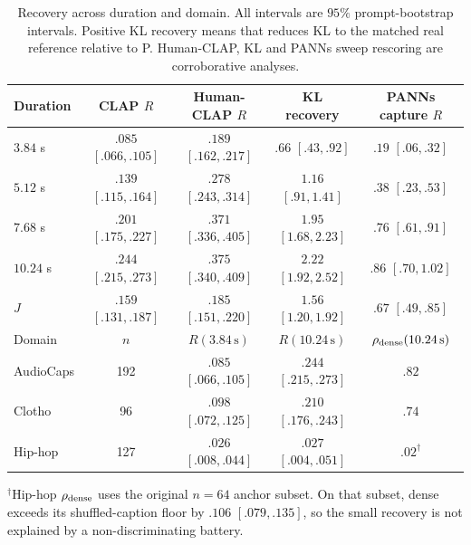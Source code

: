 \begin{table}[t]
\centering
\caption{Recovery across duration and domain. All intervals are $95\%$ prompt-bootstrap intervals. Positive KL recovery means that \PFT{} reduces KL to the matched real reference relative to P. Human-CLAP, KL and PANNs sweep rescoring are corroborative analyses.}
\label{tab:evidence}
\setlength{\tabcolsep}{4.2pt}
\begin{tabular}{@{}lcccc@{}}
\toprule
Duration & CLAP $R$ & Human-CLAP $R$ & KL recovery & PANNs capture $R$ \\
\midrule
$3.84$ s & $.085$ $[.066,.105]$ & $.189$ $[.162,.217]$ & $.66$ $[.43,.92]$ & $.19$ $[.06,.32]$ \\
$5.12$ s & $.139$ $[.115,.164]$ & $.278$ $[.243,.314]$ & $1.16$ $[.91,1.41]$ & $.38$ $[.23,.53]$ \\
$7.68$ s & $.201$ $[.175,.227]$ & $.371$ $[.336,.405]$ & $1.95$ $[1.68,2.23]$ & $.76$ $[.61,.91]$ \\
$10.24$ s & $.244$ $[.215,.273]$ & $.375$ $[.340,.409]$ & $2.22$ $[1.92,2.52]$ & $.86$ $[.70,1.02]$ \\
$J$ & $.159$ $[.131,.187]$ & $.185$ $[.151,.220]$ & $1.56$ $[1.20,1.92]$ & $.67$ $[.49,.85]$ \\
\midrule
Domain & $n$ & $R(3.84\,\mathrm{s})$ & $R(10.24\,\mathrm{s})$ & $\rho_{\rm dense}(10.24\,\mathrm{s})$ \\
\midrule
AudioCaps & 192 & $.085$ $[.066,.105]$ & $.244$ $[.215,.273]$ & $.82$ \\
Clotho & 96 & $.098$ $[.072,.125]$ & $.210$ $[.176,.243]$ & $.74$ \\
Hip-hop & 127 & $.026$ $[.008,.044]$ & $.027$ $[.004,.051]$ & $.02^{\dagger}$ \\
\bottomrule
\end{tabular}
\vspace{1pt}
\parbox{0.98\textwidth}{$^{\dagger}$Hip-hop $\rho_{\rm dense}$ uses the original $n=64$ anchor subset. On that subset, dense exceeds its shuffled-caption floor by $.106$ $[.079,.135]$, so the small recovery is not explained by a non-discriminating battery.}
\end{table}

